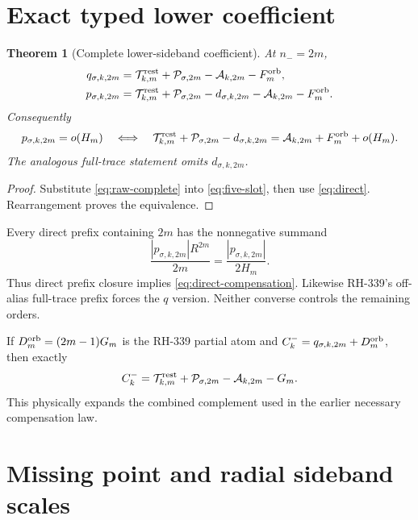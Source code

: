 \documentclass[11pt]{article}
\newtheorem{theorem}{Theorem}[section]
\theoremstyle{remark}
\newcommand{\cP}{\mathcal P}
\newcommand{\cA}{\mathcal A}
\newcommand{\cT}{\mathcal T}
\begin{document}
\section{Exact typed lower coefficient}

\begin{theorem}[Complete lower-sideband coefficient]
\label{thm:coefficient}
At $n_-=2m$,
\begin{align}
 q_{\sigma,k,2m}
 &=\cT_{k,m}^{\rm rest}+\cP_{\sigma,2m}
 -\cA_{k,2m}-F_m^{\rm orb},
 \label{eq:q-lower}\\
 p_{\sigma,k,2m}
 &=\cT_{k,m}^{\rm rest}+\cP_{\sigma,2m}-d_{\sigma,k,2m}
 -\cA_{k,2m}-F_m^{\rm orb}.
 \label{eq:p-lower}
\end{align}
Consequently
\begin{equation}\label{eq:direct-compensation}
 p_{\sigma,k,2m}=o(H_m)
 \quad\Longleftrightarrow\quad
 \cT_{k,m}^{\rm rest}+\cP_{\sigma,2m}-d_{\sigma,k,2m}
 =\cA_{k,2m}+F_m^{\rm orb}+o(H_m).
\end{equation}
The analogous full-trace statement omits $d_{\sigma,k,2m}$.
\end{theorem}

\begin{proof}
Substitute \eqref{eq:raw-complete} into \eqref{eq:five-slot}, then use
\eqref{eq:direct}.  Rearrangement proves the equivalence.
\end{proof}

Every direct prefix containing $2m$ has the nonnegative summand
\begin{equation}\label{eq:weighted}
 \frac{|p_{\sigma,k,2m}|R^{2m}}{2m}
 =\frac{|p_{\sigma,k,2m}|}{2H_m}.
\end{equation}
Thus direct prefix closure implies \eqref{eq:direct-compensation}.  Likewise
RH-339's off-alias full-trace prefix forces the $q$ version.  Neither converse
controls the remaining orders.

If $D_m^{\rm orb}=(2m-1)G_m$ is the RH-339 partial atom and
$C_k^-=q_{\sigma,k,2m}+D_m^{\rm orb}$, then exactly
\begin{equation}\label{eq:Cminus}
 C_k^-=\cT_{k,m}^{\rm rest}+\cP_{\sigma,2m}
 -\cA_{k,2m}-G_m.
\end{equation}
This physically expands the combined complement used in the earlier
necessary compensation law.

\section{Missing point and radial sideband scales}
\end{document}

